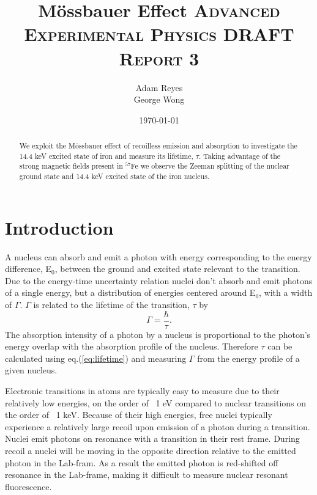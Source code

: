 \documentclass[paper=a4, fontsize=11pt, abstract=on]{scrartcl} %
\title{	
M\"{o}ssbauer Effect
\horrule{0.5pt}
\normalfont \normalsize 
\textsc{Advanced Experimental Physics DRAFT Report 3 }
}
\author{Adam Reyes \\ George Wong} %
\date{\normalsize\today} %
\numberwithin{equation}{section}
\numberwithin{figure}{section}
\numberwithin{table}{section}
\begin{document}
\maketitle



\begin{abstract}
We exploit the M\"{o}ssbauer effect of recoilless emission and
absorption to investigate the 14.4 keV excited state of iron and
measure its lifetime, $\tau$. Taking
advantage of the strong magnetic fields present in $^{57}$Fe we
observe the Zeeman splitting of the nuclear ground state and 14.4 keV
excited state of the iron nucleus.
\end{abstract}


\section{Introduction}

A nucleus can absorb and emit a photon with energy corresponding to
the energy difference, E$_0$, between the ground and excited state relevant to
the transition. Due to the energy-time uncertainty relation nuclei
don't absorb and emit photons of a single energy, but a distribution
of energies centered around E$_0$, with a width of $\Gamma$. $\Gamma$
is related to the lifetime of the transition, $\tau$ by
\begin{equation}
  \label{eq:lifetime}
  \Gamma = \frac{\hbar}{\tau}.
\end{equation}
The absorption intensity of a photon by a nucleus is proportional to the photon's
energy overlap with the absorption profile of the nucleus. Therefore
$\tau$ can be calculated using eq.(\ref{eq:lifetime}) and measuring
$\Gamma$ from the energy profile of a given nucleus.

\vline

Electronic transitions in atoms are typically easy to measure due to
their relatively low energies, on the order of ~1 eV compared to
nuclear transitions on the order of ~1 keV. Because of their high
energies, free nuclei typically experience a relatively large recoil
upon emission of a photon during a transition. Nuclei emit photons on
resonance with a transition in their rest frame. During recoil a
nuclei will be moving in the opposite direction relative to the
emitted photon in the Lab-fram. As a result the emitted photon is
red-shifted off resonance in the Lab-frame, making it difficult to
measure nuclear resonant fluorescence.
\end{document}
